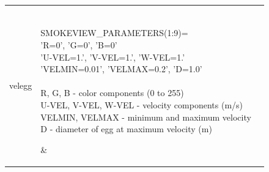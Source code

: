 \begin{longtable}[ht]{|l|l|c|}
{\ct velegg} &
\parbox[c]{\boxwidth}{
\hspace{1in} \\
{\ct SMOKEVIEW\_PARAMETERS(1:9)=} \\
{\ct 'R=0', 'G=0', 'B=0'} \\
{\ct 'U-VEL=1.', 'V-VEL=1.', 'W-VEL=1.'}  \\
{\ct 'VELMIN=0.01', 'VELMAX=0.2', 'D=1.0'} \\  \\
{\ct R, G, B} - color components (0 to 255) \\
{\ct U-VEL, V-VEL, W-VEL} - velocity components (m/s) \\
{\ct VELMIN, VELMAX} - minimum and maximum velocity\\
{\ct D} - diameter of egg at maximum velocity (m) \\
\hspace{1in}
} &
 \\ \hline

{\ct veltube} &
\parbox[c]{\boxwidth}{
\hspace{1in} \\
{\ct SMOKEVIEW\_PARAMETERS(1:9)=}\\
{\ct 'R=0', 'G=0',  'B=0'} \\
{\ct 'U-VEL=1.', 'V-VEL=1.', 'W-VEL=1.' }  \\
{\ct 'VELMIN=0.01', 'VELMAX=0.2', 'D=0.1'} \\  \\
{\ct R, G, B} - color components (0 to 255) \\
{\ct U-VEL, V-VEL, W-VEL} - velocity components (m/s) \\
{\ct VELMIN, VELMAX} - minimum and maximum velocity \\
{\ct D} - diameter of tube at {\ct VELMAX} (m) \\
\hspace{1in}
} &
 \\ \hline
\end{longtable}
